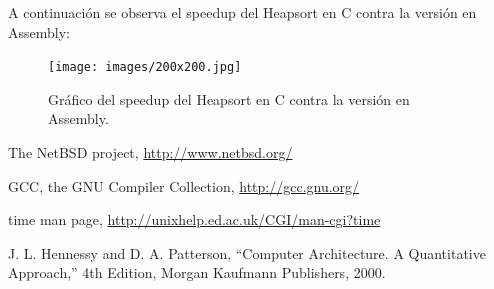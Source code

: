 \documentclass{article}
\begin{document}
	A continuación se observa el speedup del Heapsort en C contra la versión en Assembly:
	\medskip

	\begin{figure}[H]
		\centering
		\texttt{[image: images/200x200.jpg]}
		\medskip
		\caption{Gráfico del speedup del Heapsort en C contra la versión en Assembly.}
	\end{figure}
	\bigskip\bigskip



\begin{thebibliography}{99}

	 The NetBSD project, \url{http://www.netbsd.org/}

	 GCC, the GNU Compiler Collection, \url{http://gcc.gnu.org/}

	 time man page, \url{http://unixhelp.ed.ac.uk/CGI/man-cgi?time}

	 J. L. Hennessy and D. A. Patterson, ``Computer Architecture. A Quantitative
	Approach,'' 4th Edition, Morgan Kaufmann Publishers, 2000.

	\end{thebibliography}

\newpage
\end{document}
